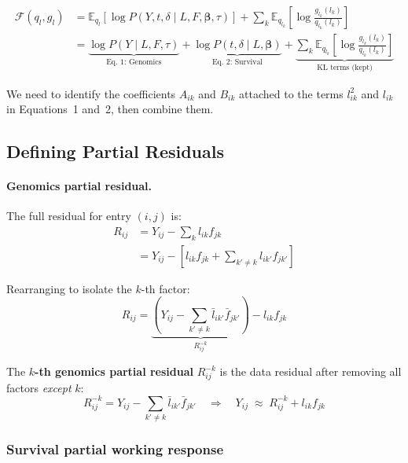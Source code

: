 \documentclass[11pt]{article}
\newcommand{\lbar}[2]{\bar{l}_{#1#2}}
\newcommand{\fbar}[2]{\bar{f}_{#1#2}}
\begin{document}
\begin{align}
  \mathcal{F}(q_l, g_l)
  &= \mathbb{E}_{q_l}\!\left[\log P(Y, t, \delta \mid L, F, \bm{\beta}, \tau)\right]
    + \sum_k \mathbb{E}_{q_{l_k}}\!\left[\log\frac{g_{l_k}(l_k)}{q_{l_k}(l_k)}\right]
  \label{eq:Fql-a}\\
  &= \underbrace{\log P(Y \mid L, F, \tau)}_{\text{Eq.\ 1: Genomics}}
    + \underbrace{\log P(t, \delta \mid L, \bm{\beta})}_{\text{Eq.\ 2: Survival}}
    + \underbrace{\sum_k \mathbb{E}_{q_{l_k}}\!\left[\log\frac{g_{l_k}(l_k)}{q_{l_k}(l_k)}\right]}_{\text{KL terms (kept)}}
  \label{eq:Fql-b}
\end{align}

We need to identify the coefficients $A_{ik}$ and $B_{ik}$ attached to the
terms $l_{ik}^2$ and $l_{ik}$ in Equations~1 and~2, then combine them.

\subsection{Defining Partial Residuals}

\paragraph{Genomics partial residual.}
The full residual for entry $(i,j)$ is:
\begin{align}
  R_{ij} &= Y_{ij} - \sum_k l_{ik}f_{jk} \label{eq:full-resid}\\
         &= Y_{ij} - \left[l_{ik}f_{jk} + \sum_{k'\neq k}l_{ik'}f_{jk'}\right]
         \label{eq:resid-split}
\end{align}

Rearranging to isolate the $k$-th factor:
\begin{equation}\label{eq:R-residual}
  R_{ij} = \underbrace{\left(Y_{ij} - \sum_{k'\neq k}\lbar{i}{k'}\fbar{j}{k'}\right)}_{R^{-k}_{ij}}
           - l_{ik}f_{jk}
\end{equation}

The \textbf{$k$-th genomics partial residual} $R^{-k}_{ij}$ is the data residual
after removing all factors \emph{except} $k$:
\begin{equation}
  R^{-k}_{ij} = Y_{ij} - \sum_{k'\neq k}\lbar{i}{k'}\fbar{j}{k'}
  \quad\Rightarrow\quad
  Y_{ij} \;\approx\; R^{-k}_{ij} + l_{ik}f_{jk}
\end{equation}

\subsubsection*{Survival partial working response}
\end{document}
